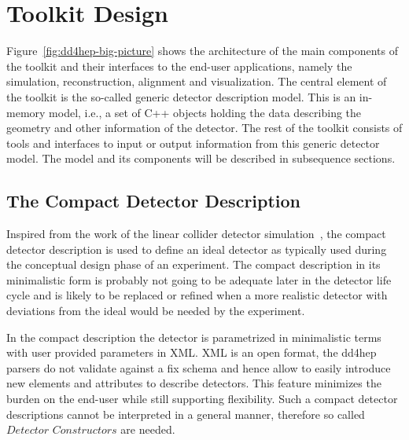 \documentclass[a4paper]{jpconf}
\begin{document}
\section{Toolkit Design}
\label{sec:toolkit-design}
\noindent
Figure~\ref{fig:dd4hep-big-picture} shows the architecture 
of the main components of the toolkit and their interfaces 
to the end-user applications, namely the simulation, reconstruction, 
alignment and visualization. 
The central element of the toolkit is the so-called generic detector 
description model. This is an in-memory model, i.e., a set of C++ objects 
holding the data describing the geometry and other information of 
the detector. The rest of the toolkit consists of tools and interfaces 
to input or output information from this generic detector model. 
The model and its components will be described in subsequence sections.

\subsection{The Compact Detector Description}
\label{sec:problem_analysis}
\noindent
Inspired from the work of the linear collider detector 
simulation~\cite{bib:Detector,bib:lcsim}, the compact detector description is used
to define an ideal detector as typically used during 
the conceptual design phase of an experiment. 
The compact description in its minimalistic form is probably not going to 
be adequate later in the detector life cycle and
is likely to be replaced or refined when a more realistic detector 
with deviations from the ideal would be needed by the experiment.

\noindent
In the compact description the detector is parametrized in minimalistic terms
with user provided parameters in XML.
XML is an open format, the dd4hep parsers do not validate against a fix schema
and hence allow to easily introduce new elements and attributes to describe 
detectors. This feature minimizes the burden on the end-user while still 
supporting flexibility.
Such a compact detector descriptions cannot be interpreted in a 
general manner, therefore so called $Detector$ $Constructors$ are needed.
\end{document}
